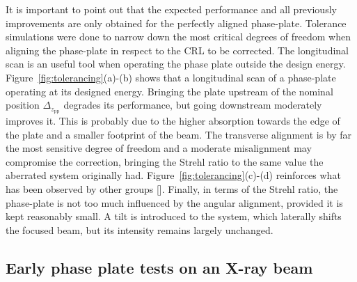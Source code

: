 \begin{refsection}
It is important to point out that the expected performance and all previously improvements are only obtained for the perfectly aligned phase-plate. Tolerance simulations were done to narrow down the most critical degrees of freedom when aligning the phase-plate in respect to the CRL to be corrected. The longitudinal scan is an useful tool when operating the phase plate outside the design energy. Figure~\ref{fig:tolerancing}(a)-(b) shows that a longitudinal scan of a phase-plate operating at its designed energy. Bringing the plate upstream of the nominal position $\Delta_{z_\text{pp}}$ degrades its performance, but going downstream moderately improves it. This is probably due to the higher absorption towards the edge of the plate and a smaller footprint of the beam. The transverse alignment is by far the most sensitive degree of freedom and a moderate misalignment may compromise the correction, bringing the Strehl ratio to the same value the aberrated system originally had. Figure~\ref{fig:tolerancing}(c)-(d) reinforces what has been observed by other groups [\cite[Fig.~5.12]{Seiboth2016b}]. Finally, in terms of the Strehl ratio, the phase-plate is not too much influenced by the angular alignment, provided it is kept reasonably small. A tilt is introduced to the system, which laterally shifts the focused beam, but its intensity remains largely unchanged.

\subsection{Early phase plate tests on an X-ray beam}


\end{refsection}
